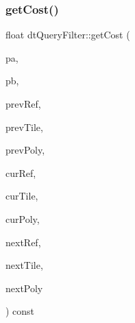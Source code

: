 \subsubsection{\texorpdfstring{get\+Cost()}{getCost()}\hspace{0.1cm}{\footnotesize\ttfamily [1/2]}}
{\footnotesize\ttfamily float dt\+Query\+Filter\+::get\+Cost (\begin{DoxyParamCaption}\item[{const float $\ast$}]{pa,  }\item[{const float $\ast$}]{pb,  }\item[{const \hyperlink{group__detour_gab4e0b2257a670c1a800057999612b466}{dt\+Poly\+Ref}}]{prev\+Ref,  }\item[{const \hyperlink{structdtMeshTile}{dt\+Mesh\+Tile} $\ast$}]{prev\+Tile,  }\item[{const \hyperlink{structdtPoly}{dt\+Poly} $\ast$}]{prev\+Poly,  }\item[{const \hyperlink{group__detour_gab4e0b2257a670c1a800057999612b466}{dt\+Poly\+Ref}}]{cur\+Ref,  }\item[{const \hyperlink{structdtMeshTile}{dt\+Mesh\+Tile} $\ast$}]{cur\+Tile,  }\item[{const \hyperlink{structdtPoly}{dt\+Poly} $\ast$}]{cur\+Poly,  }\item[{const \hyperlink{group__detour_gab4e0b2257a670c1a800057999612b466}{dt\+Poly\+Ref}}]{next\+Ref,  }\item[{const \hyperlink{structdtMeshTile}{dt\+Mesh\+Tile} $\ast$}]{next\+Tile,  }\item[{const \hyperlink{structdtPoly}{dt\+Poly} $\ast$}]{next\+Poly }\end{DoxyParamCaption}) const}

